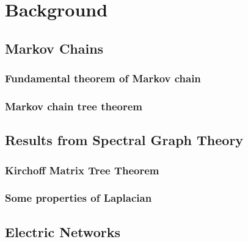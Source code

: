 
\chapter{Background} %

\label{Chapter2} %

\section{Markov Chains}

\subsection{Fundamental theorem of Markov chain}

\subsection{Markov chain tree theorem}

\section{Results from Spectral Graph Theory}

\subsection{Kirchoff Matrix Tree Theorem}

\subsection{Some properties of Laplacian}

\section{Electric Networks}









